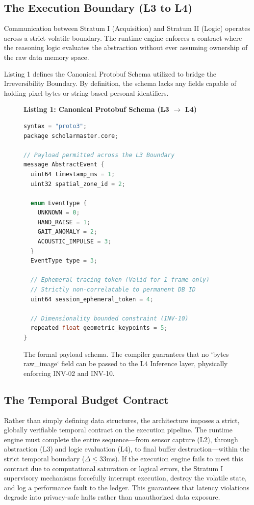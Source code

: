 \documentclass[conference]{IEEEtran}
\begin{document}
\subsection{The Execution Boundary (L3 to L4)}
Communication between Stratum I (Acquisition) and Stratum II (Logic) operates across a strict volatile boundary. The runtime engine enforces a contract where the reasoning logic evaluates the abstraction without ever assuming ownership of the raw data memory space.

Listing 1 defines the Canonical Protobuf Schema utilized to bridge the Irreversibility Boundary. By definition, the schema lacks any fields capable of holding pixel bytes or string-based personal identifiers. 

\begin{figure}[htbp]
\textbf{Listing 1: Canonical Protobuf Schema (L3 $\to$ L4)}
\begin{lstlisting}[language=C++]
syntax = "proto3";
package scholarmaster.core;

// Payload permitted across the L3 Boundary
message AbstractEvent {
  uint64 timestamp_ms = 1;
  uint32 spatial_zone_id = 2;
  
  enum EventType {
    UNKNOWN = 0;
    HAND_RAISE = 1;
    GAIT_ANOMALY = 2;
    ACOUSTIC_IMPULSE = 3;
  }
  EventType type = 3;
  
  // Ephemeral tracing token (Valid for 1 frame only)
  // Strictly non-correlatable to permanent DB ID
  uint64 session_ephemeral_token = 4;
  
  // Dimensionality bounded constraint (INV-10)
  repeated float geometric_keypoints = 5; 
}
\end{lstlisting}
\caption{The formal payload schema. The compiler guarantees that no `bytes raw\_image` field can be passed to the L4 Inference layer, physically enforcing INV-02 and INV-10.}
\label{fig:protobuf}
\end{figure}

\subsection{The Temporal Budget Contract}
Rather than simply defining data structures, the architecture imposes a strict, globally verifiable temporal contract on the execution pipeline. The runtime engine must complete the entire sequence—from sensor capture (L2), through abstraction (L3) and logic evaluation (L4), to final buffer destruction—within the strict temporal boundary ($\Delta \le 33$ms). If the execution engine fails to meet this contract due to computational saturation or logical errors, the Stratum I supervisory mechanisms forcefully interrupt execution, destroy the volatile state, and log a performance fault to the ledger. This guarantees that latency violations degrade into privacy-safe halts rather than unauthorized data exposure.
\end{document}
